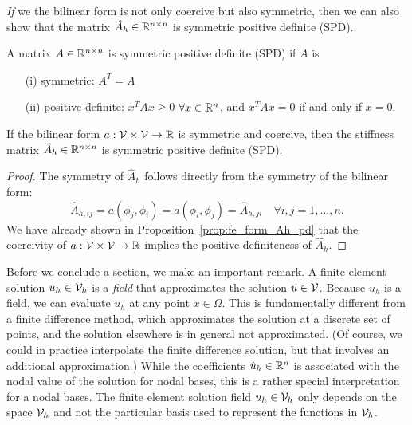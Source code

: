 \emph{If} we the bilinear form is not only coercive but also symmetric, then we can also show that the matrix $\hat A_h \in \mathbb{R}^{n \times n}$ is symmetric positive definite (SPD).
\begin{definition}
  A matrix $A \in \mathbb{R}^{n \times n}$ is symmetric positive definite (SPD) if $A$ is
  \begin{itemize}
  \item[(i)] symmetric: $A^T = A$
  \item[(ii)] positive definite: $x^T A x \geq 0$ $\forall x \in \mathbb{R}^n$, and $x^T A x = 0$ if and only if $x = 0$.
  \end{itemize}
\end{definition}
\begin{proposition}
  \label{prop:fe_form_Ah_spd}
  If the bilinear form $a: \mathcal{V} \times \mathcal{V} \to \mathbb{R}$ is symmetric and coercive, then the stiffness matrix $\hat A_h \in \mathbb{R}^{n \times n}$ is symmetric positive definite (SPD).
  \begin{proof}
    The symmetry of $\hat A_h$ follows directly from the symmetry of the bilinear form:
  \begin{equation*}
    \hat A_{h,ij} = a(\phi_j,\phi_i) = a(\phi_i,\phi_j) = \hat A_{h,ji} \quad  \forall i,j = 1, \dots, n.
  \end{equation*}
  We have already shown in Proposition~\ref{prop:fe_form_Ah_pd} that the coercivity of $a: \mathcal{V} \times \mathcal{V} \to \mathbb{R}$ implies the positive definiteness of $\hat A_h$.
  \end{proof}
\end{proposition}

Before we conclude a section, we make an important remark.  A finite element solution $u_h \in \mathcal{V}_h$ is a \emph{field} that approximates the solution $u \in \mathcal{V}$. Because $u_h$ is a field, we can evaluate $u_h$ at any point $x \in \Omega$.  This is fundamentally different from a finite difference method, which approximates the solution at a discrete set of points, and the solution elsewhere is in general not approximated.  (Of course, we could in practice interpolate the finite difference solution, but that involves an additional approximation.)  While the coefficients $\hat u_h \in \mathbb{R}^n$ is associated with the nodal value of the solution for nodal bases, this is a rather special interpretation for a nodal bases. The finite element solution field $u_h \in \mathcal{V}_h$ only depends on the space $\mathcal{V}_h$ and not the particular basis used to represent the functions in $\mathcal{V}_h$. 

